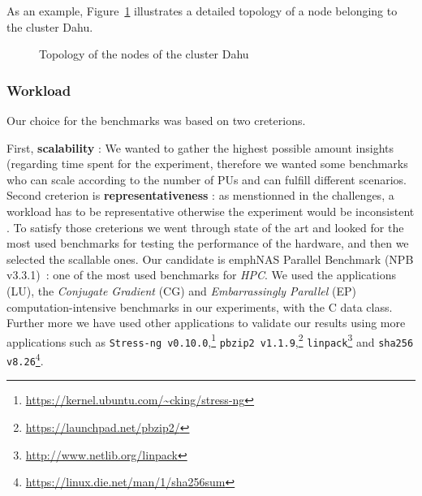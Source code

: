 As an example, Figure~\ref{fig:topo} illustrates a detailed topology of a node belonging to the cluster \textsf{Dahu}.

\begin{figure}%
    \caption{Topology of the nodes of the cluster \textsf{Dahu}}\label{fig:topo}
\end{figure}

\subsubsection{Workload}
Our choice for the benchmarks was based on two creterions.

First, \textbf{scalability} : We wanted to gather the highest possible amount insights (regarding time spent for the experiment, therefore we wanted some benchmarks who can scale according to the number of PUs and can fulfill different scenarios.
Second creterion is \textbf{representativeness} : as menstionned in the challenges, a workload has to be representative otherwise the experiment would be inconsistent \cite{stephen_evaluate_2012}.
To satisfy those creterions we went through state of the art and looked for the most used benchmarks for testing the performance of the hardware, and then we selected the scallable ones.
Our candidate is  emph{NAS Parallel Benchmark} (NPB v3.3.1)~\cite{Bailey:1991:NPB:125826.125925}: one of the most used benchmarks for \emph{HPC}. We used the applications (\textsf{LU}), the \emph{Conjugate Gradient} (\textsf{CG}) and \emph{Embarrassingly Parallel} (\textsf{EP}) computation-intensive benchmarks in our experiments, with the \textsf{C} data class.
Further more we have used other applications to validate our results using more applications such as \texttt{Stress-ng v0.10.0},\footnote{\url{https://kernel.ubuntu.com/~cking/stress-ng}} \texttt{pbzip2 v1.1.9},\footnote{\url{https://launchpad.net/pbzip2/}} \texttt{linpack}\footnote{\url{http://www.netlib.org/linpack}} and \texttt{sha256 v8.26}\footnote{\url{https://linux.die.net/man/1/sha256sum}}.


